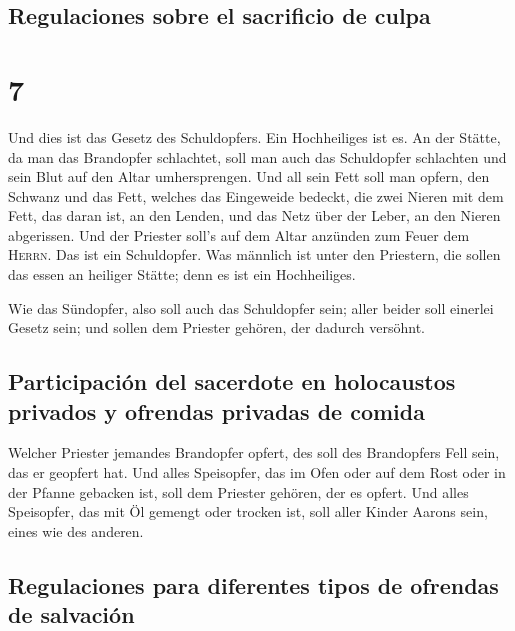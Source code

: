 \hypertarget{regulaciones-sobre-el-sacrificio-de-culpa}{%
\subsection{Regulaciones sobre el sacrificio de
culpa}\label{regulaciones-sobre-el-sacrificio-de-culpa}}

\hypertarget{section-6}{%
\section{7}\label{section-6}}

 Und dies ist das Gesetz des Schuldopfers. Ein
Hochheiliges ist es.  An der Stätte, da man das Brandopfer
schlachtet, soll man auch das Schuldopfer schlachten und sein Blut auf
den Altar umhersprengen.  Und all sein Fett soll man
opfern, den Schwanz und das Fett, welches das Eingeweide bedeckt,
 die zwei Nieren mit dem Fett, das daran ist, an den
Lenden, und das Netz über der Leber, an den Nieren abgerissen.
 Und der Priester soll's auf dem Altar anzünden zum Feuer
dem \textsc{Herrn}. Das ist ein Schuldopfer.  Was männlich
ist unter den Priestern, die sollen das essen an heiliger Stätte; denn
es ist ein Hochheiliges.

 Wie das Sündopfer, also soll auch das Schuldopfer sein;
aller beider soll einerlei Gesetz sein; und sollen dem Priester gehören,
der dadurch versöhnt.

\hypertarget{participaciuxf3n-del-sacerdote-en-holocaustos-privados-y-ofrendas-privadas-de-comida}{%
\subsection{Participación del sacerdote en holocaustos privados y
ofrendas privadas de
comida}\label{participaciuxf3n-del-sacerdote-en-holocaustos-privados-y-ofrendas-privadas-de-comida}}

 Welcher Priester jemandes Brandopfer opfert, des soll des
Brandopfers Fell sein, das er geopfert hat.  Und alles
Speisopfer, das im Ofen oder auf dem Rost oder in der Pfanne gebacken
ist, soll dem Priester gehören, der es opfert.  Und alles
Speisopfer, das mit Öl gemengt oder trocken ist, soll aller Kinder
Aarons sein, eines wie des anderen.

\hypertarget{regulaciones-para-diferentes-tipos-de-ofrendas-de-salvaciuxf3n}{%
\subsection{Regulaciones para diferentes tipos de ofrendas de
salvación}\label{regulaciones-para-diferentes-tipos-de-ofrendas-de-salvaciuxf3n}}

